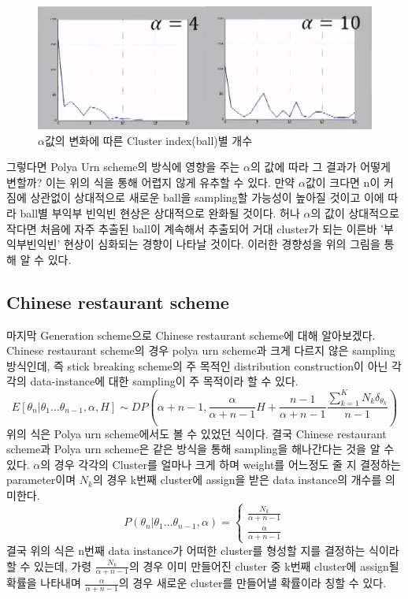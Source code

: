 \documentclass[a4paper]{oblivoir}
\begin{document}
\begin{figure}[ht] \centering 
\includegraphics[scale=0.7]{fig13_5.png} 
\caption{$\alpha$값의 변화에 따른 Cluster index(ball)별 개수}
\label{fig:13-5}
\end{figure}

그렇다면 Polya Urn scheme의 방식에 영향을 주는 $\alpha$의 값에 따라 그 결과가 어떻게 변할까? 이는 위의 식을 통해 어렵지 않게 유추할 수 있다. 만약 $\alpha$값이 크다면 n이 커짐에 상관없이 상대적으로 새로운 ball을 sampling할 가능성이 높아질 것이고 이에 따라 ball별 부익부 빈익빈 현상은 상대적으로 완화될 것이다. 허나 $\alpha$의 값이 상대적으로 작다면 처음에 자주 추출된 ball이 계속해서 추출되어 거대 cluster가 되는 이른바 '부익부빈익빈' 현상이 심화되는 경향이 나타날 것이다. 이러한 경향성을 위의 그림을 통해 알 수 있다. 

\subsection{Chinese restaurant scheme}
마지막 Generation scheme으로 Chinese restaurant scheme에 대해 알아보겠다. Chinese restaurant scheme의 경우 polya urn scheme과 크게 다르지 않은 sampling 방식인데, 즉 stick breaking scheme의 주 목적인 distribution construction이 아닌 각각의 data-instance에 대한 sampling이 주 목적이라 할 수 있다. 
\begin{equation}
E[\theta_{n}|\theta_{1}...\theta_{n-1},\alpha,H] \sim DP(\alpha+n-1,\frac{\alpha}{\alpha+n-1}H + \frac{n-1}{\alpha+n-1}\frac{\sum^{K}_{k=1}N_{k}\delta_{\theta_{k}}}{n-1})
\end{equation}
위의 식은 Polya urn scheme에서도 볼 수 있었던 식이다. 결국 Chinese restaurant scheme과 Polya urn scheme은 같은 방식을 통해 sampling을 해나간다는 것을 알 수 있다. $\alpha$의 경우 각각의 Cluster를 얼마나 크게 하며 weight를 어느정도 줄 지 결정하는 parameter이며 $N_{k}$의 경우 k번째 cluster에 assign을 받은 data instance의 개수를 의미한다. 
\begin{equation}
P(\theta_{n}|\theta_{1}...\theta_{n-1},\alpha) = 
\begin{cases} 
\frac{N_{k}}{\alpha+n-1}\\
\frac{\alpha}{\alpha+n-1}
\end{cases}
\end{equation}
결국 위의 식은 n번째 data instance가 어떠한 cluster를 형성할 지를 결정하는 식이라 할 수 있는데, 가령 $\frac{N_{k}}{\alpha+n-1}$의 경우 이미 만들어진 cluster 중 k번째 cluster에 assign될 확률을 나타내며 $\frac{\alpha}{\alpha+n-1}$의 경우 새로운 cluster를 만들어낼 확률이라 칭할 수 있다. 
\end{document}
